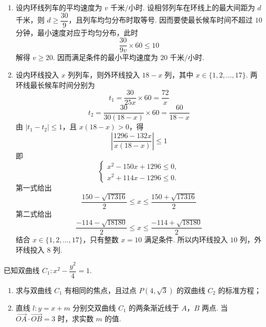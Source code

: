 \begin{solution}
\begin{enumerate}
\item 设内环线列车的平均速度为 \(v\text{ 千米/小时}\). 设相邻列车在环线上的最大间距为 \(d\) 千米，则 \(d\ge\dfrac{30}{9}\)，且列车均匀分布时取等号. 因而要使最长候车时间不超过 \(10\) 分钟，最小速度对应于均匀分布，此时
\[
\frac{30}{9v}\times60\le10
\]
解得 \(v\ge20\). 因而满足条件的最小平均速度为 \(20\text{ 千米/小时}\).

\item 设内环线投入 \(x\) 列列车，则外环线投入 \(18-x\) 列，其中 \(x\in\{1,2,\ldots,17\}\). 两环线最长候车时间分别为
\[
t_1=\frac{30}{25x}\times60=\frac{72}{x}
\]
\[
t_2=\frac{30}{30(18-x)}\times60=\frac{60}{18-x}
\]
由 \(|t_1-t_2|\le1\)，且 \(x(18-x)>0\)，得
\[
\left|\frac{1296-132x}{x(18-x)}\right|\le1
\]
即
\[
\begin{cases}
x^2-150x+1296\le0,\\
x^2+114x-1296\le0.
\end{cases}
\]
第一式给出
\[
\frac{150-\sqrt{17316}}2\le x\le\frac{150+\sqrt{17316}}2
\]
第二式给出
\[
\frac{-114-\sqrt{18180}}2\le x\le\frac{-114+\sqrt{18180}}2
\]
结合 \(x\in\{1,2,\ldots,17\}\)，只有整数 \(x=10\) 满足条件. 所以内环线投入 \(10\) 列，外环线投入 \(8\) 列.
\end{enumerate}
\end{solution}

\begin{problem}
已知双曲线 \(C_1:x^2-\dfrac{y^2}{4}=1\).

\begin{enumerate}
\item 求与双曲线 \(C_1\) 有相同的焦点，且过点 \(P(4,\sqrt3)\) 的双曲线 \(C_2\) 的标准方程；
\item 直线 \(l:y=x+m\) 分别交双曲线 \(C_1\) 的两条渐近线于 \(A\)，\(B\) 两点. 当 \(\overrightarrow{OA}\cdot\overrightarrow{OB}=3\) 时，求实数 \(m\) 的值.
\end{enumerate}
\end{problem}

